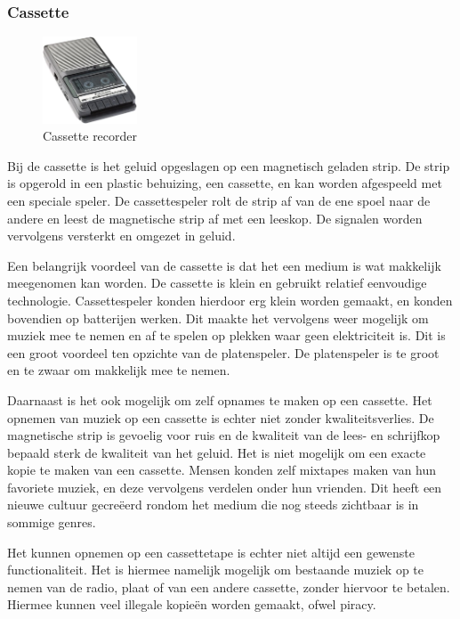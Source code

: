 \subsubsection*{Cassette}
\begin{figure}
    \centering
    \includegraphics[width=0.25\textwidth]{assets/critical-review/Tape.jpg}
    \caption{Cassette recorder}
    \label{fig:critical-review:tape}
\end{figure}
Bij de cassette is het geluid opgeslagen op een magnetisch geladen strip. De strip is opgerold in een plastic behuizing, een cassette, en kan worden afgespeeld met een speciale speler. De cassettespeler rolt de strip af van de ene spoel naar de andere en leest de magnetische strip af met een leeskop. De signalen worden vervolgens versterkt en omgezet in geluid.

Een belangrijk voordeel van de cassette is dat het een medium is wat makkelijk meegenomen kan worden. De cassette is klein en gebruikt relatief eenvoudige technologie. Cassettespeler konden hierdoor erg klein worden gemaakt, en konden bovendien op batterijen werken. Dit maakte het vervolgens weer mogelijk om muziek mee te nemen en af te spelen op plekken waar geen elektriciteit is. Dit is een groot voordeel ten opzichte van de platenspeler. De platenspeler is te groot en te zwaar om makkelijk mee te nemen.

Daarnaast is het ook mogelijk om zelf opnames te maken op een cassette. Het opnemen van muziek op een cassette is echter niet zonder kwaliteitsverlies. De magnetische strip is gevoelig voor ruis en de kwaliteit van de lees- en schrijfkop bepaald sterk de kwaliteit van het geluid. Het is niet mogelijk om een exacte kopie te maken van een cassette. Mensen konden zelf mixtapes maken van hun favoriete muziek, en deze vervolgens verdelen onder hun vrienden. Dit heeft een nieuwe cultuur gecreëerd rondom het medium die nog steeds zichtbaar is in sommige genres.

Het kunnen opnemen op een cassettetape is echter niet altijd een gewenste functionaliteit. Het is hiermee namelijk mogelijk om bestaande muziek op te nemen van de radio, plaat of van een andere cassette, zonder hiervoor te betalen. Hiermee kunnen veel illegale kopieën worden gemaakt, ofwel piracy. 

